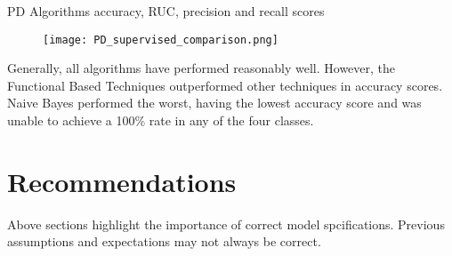 \bigskip
\begin{table}[h]
    \caption{PD Algorithms accuracy, RUC, precision and recall scores \cite{8300383}}
    \begin{figure}[H]
        \texttt{[image: PD\_supervised\_comparison.png]}
        \centering
    \end{figure}
    \label{fig:PD_table}
\end{table}

Generally, all algorithms have performed reasonably well. However, the Functional Based Techniques outperformed other techniques in accuracy scores. 
Naive Bayes performed the worst, having the lowest accuracy score and was unable to achieve a 100\% rate in any of the four classes.


\section{Recommendations}
Above sections highlight the importance of correct model spcifications. Previous assumptions and expectations may not always be correct.

